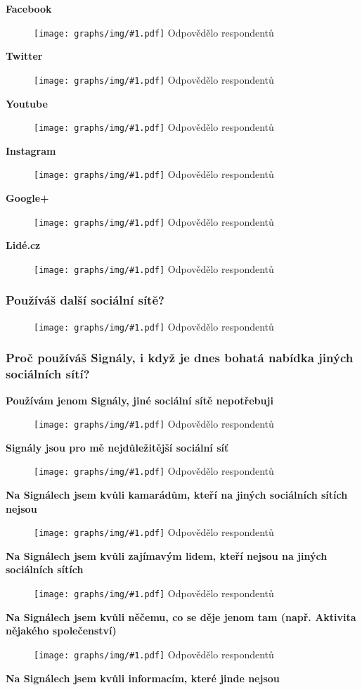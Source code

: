 \documentclass[12pt, a4paper, twoside]{article}
\newcommand{\answercount}[1]{Odpovědělo  respondentů}
\newcommand{\includegraph}[2]{
  \begin{figure}[H]
    \centering
    \textbf{#2}
    \texttt{[image: graphs/img/\#1.pdf]}
    \answercount{#1}
  \end{figure}
}
\begin{document}
\textbf{Facebook}

\includegraph{jine_site_Facebook}{}

\textbf{Twitter}

\includegraph{jine_site_Twitter}{}

\textbf{Youtube}

\includegraph{jine_site_Youtube}{}

\textbf{Instagram}

\includegraph{jine_site_Instagram}{}

\textbf{Google+}

\includegraph{jine_site_Googleplus}{}

\textbf{Lidé.cz}

\includegraph{jine_site_Lidecz}{}

\subsubsection{Používáš další sociální sítě?}

\includegraph{pouzivas_dalsi_socialni_site}{}

\subsubsection{Proč používáš Signály, i když je dnes bohatá nabídka jiných sociálních sítí?}

\textbf{Používám jenom Signály, jiné sociální sítě nepotřebuji}

\includegraph{proc_signaly_jenom_signaly}{}

\textbf{Signály jsou pro mě nejdůležitější sociální síť}

\includegraph{proc_signaly_signaly_nejdulezitejsi}{}

\textbf{Na Signálech jsem kvůli kamarádům, kteří na jiných sociálních sítích nejsou}

\includegraph{proc_signaly_kamaradi_kteri_jinde_nejsou}{}

\textbf{Na Signálech jsem kvůli zajímavým lidem, kteří nejsou na jiných sociálních sítích}

\includegraph{proc_signaly_zajimavi_lide_kteri_jinde_nejsou}{}

\textbf{Na Signálech jsem kvůli něčemu, co se děje jenom tam (např. Aktivita nějakého společenství)}

\includegraph{proc_signaly_jedinecna_aktivita}{}

\textbf{Na Signálech jsem kvůli informacím, které jinde nejsou}
\end{document}
